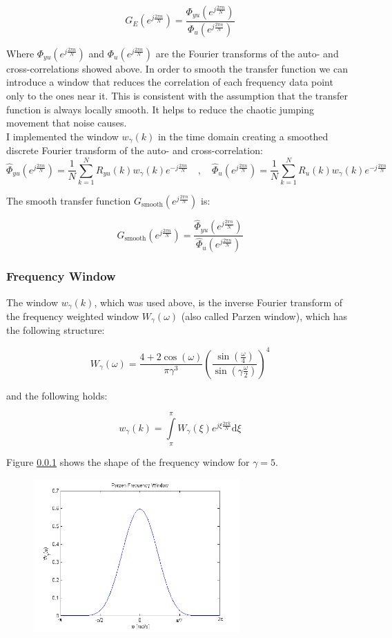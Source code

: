  \[G_E(e^{j\frac{2\pi n}{N}}) = \frac{\Phi_{yu}(e^{j\frac{2\pi n}{N}})}{\Phi_{u}(e^{j\frac{2\pi n}{N}})}\]

Where $\Phi_{yu}(e^{j\frac{2\pi n}{N}})$ and $\Phi_{u}(e^{j\frac{2\pi n}{N}})$ are the Fourier transforms of the auto- and cross-correlations showed above. In order to smooth the transfer function we can introduce a window that reduces the correlation of each frequency data point only to the ones near it. This is consistent with the assumption that the transfer function is always locally smooth. It helps to reduce the chaotic jumping movement that noise causes. \\

I implemented the window $w_\gamma(k)$ in the time domain creating a smoothed discrete Fourier transform of the auto- and cross-correlation:
\[\hat{\Phi}_{yu}(e^{j\frac{2\pi n}{N}}) = \frac{1}{N}\sum\limits_{k = 1}^{N }R_{yu}(k)w_\gamma(k)e^{-j\frac{2\pi n}{N}} \quad, \quad \hat{\Phi}_{u}(e^{j\frac{2\pi n}{N}}) = \frac{1}{N}\sum\limits_{k = 1}^{N }R_{u}(k)w_\gamma(k)e^{-j\frac{2\pi n}{N}}\]

The smooth transfer function $G_\text{smooth}(e^{j\frac{2\pi n}{N}})$ is:


 \[G_\text{smooth}(e^{j\frac{2\pi n}{N}}) = \frac{\hat{\Phi}_{yu}(e^{j\frac{2\pi n}{N}})}{\hat{\Phi}_{u}(e^{j\frac{2\pi n}{N}})}\]


\subsubsection{Frequency Window}

The window $w_\gamma(k)$, which was used above, is the inverse Fourier transform of the frequency weighted window $W_\gamma(\omega)$ (also called Parzen window), which has the following structure:

\[W_\gamma(\omega) = \frac{4+2\cos(\omega)}{\pi \gamma^3}\left( \frac{\sin(\frac{\omega}{4})}{\sin(\gamma\frac{\omega}{2})}\right)^4 \]

and the following holds:

\[w_\gamma(k) = \int\limits_\pi^\pi W_\gamma(\xi)e^{j\xi \frac{2\pi k}{N}}\text{d}\xi\]

Figure \ref{} shows the shape of the frequency window for $\gamma = 5$.


\begin{figure}[H]
\centering
\includegraphics[width=0.7\textwidth]{pics/parzen}
\caption{}
\label{pic:}
\end{figure}



